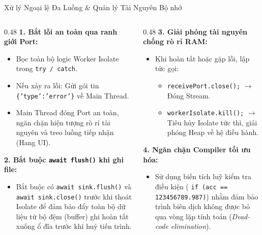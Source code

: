 \documentclass[aspectratio=169, 10pt]{beamer}
\begin{document}
\begin{frame}{Xử lý Ngoại lệ Đa Luồng \& Quản lý Tài Nguyên Bộ nhớ}
  \begin{columns}[t]
    \begin{column}{0.48\textwidth}
      \textbf{1. Bắt lỗi an toàn qua ranh giới Port:}
      \begin{itemize}
        \item Bọc toàn bộ logic Worker Isolate trong \texttt{try / catch}.
        \item Nếu xảy ra lỗi: Gửi gói tin \texttt{\{'type':'error'\}} về Main Thread.
        \item Main Thread đóng Port an toàn, ngăn chặn hiện tượng rò rỉ tài nguyên và treo luồng tiếp nhận (Hang UI).
      \end{itemize}
      \vspace{0.2cm}
      \textbf{2. Bắt buộc \texttt{await flush()} khi ghi file:}
      \begin{itemize}
        \item Bắt buộc có \texttt{await sink.flush()} và \texttt{await sink.close()} trước khi thoát Isolate để đảm bảo đẩy toàn bộ dữ liệu từ bộ đệm (buffer) ghi hoàn tất xuống ổ đĩa trước khi huỷ tiến trình.
      \end{itemize}
    \end{column}

    \begin{column}{0.48\textwidth}
      \textbf{3. Giải phóng tài nguyên chống rò rỉ RAM:}
      \begin{itemize}
        \item Khi hoàn tất hoặc gặp lỗi, lập tức gọi:
        \begin{itemize}
          \item \texttt{receivePort.close();} $\rightarrow$ Đóng Stream.
          \item \texttt{workerIsolate.kill();} $\rightarrow$ Tiêu hủy Isolate tức thì, giải phóng Heap về hệ điều hành.
        \end{itemize}
      \end{itemize}
      \vspace{0.2cm}
      \textbf{4. Ngăn chặn Compiler tối ưu hóa:}
      \begin{itemize}
        \item Sử dụng biến tích luỹ kiểm tra điều kiện ( \texttt{if (acc == 123456789.987)}) nhằm đảm bảo trình biên dịch không được bỏ qua vòng lặp tính toán (\textit{Dead-code elimination}).
      \end{itemize}
    \end{column}
  \end{columns}
\end{frame}
\end{document}

